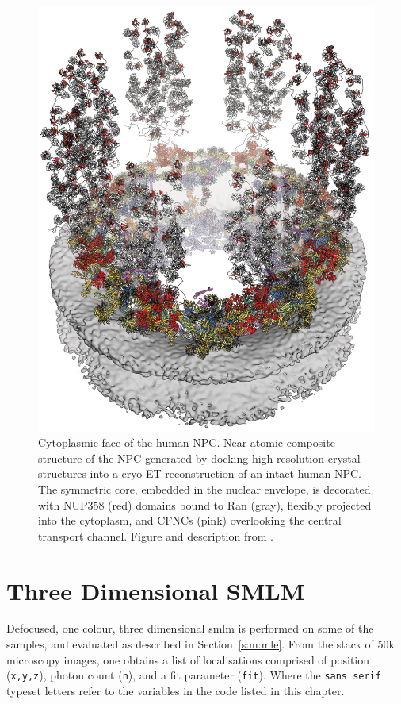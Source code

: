 \documentclass[11pt, a4paper, oneside, twocolumn]{report}
\renewcommand{\tt}{\texttt}
\begin{document}
~ %
\begin{figure}[!p]
  \centering
  \includegraphics[width=\textwidth]{npc/npc3.jpg}
  \caption{Cytoplasmic face of the human NPC.  Near-atomic composite
    structure of the NPC generated by docking high-resolution crystal
    structures into a cryo‑ET reconstruction of an intact human NPC. The
    symmetric core, embedded in the nuclear envelope, is decorated with
    NUP358 (red) domains bound to Ran (gray), flexibly projected into the
    cytoplasm, and CFNCs (pink) overlooking the central transport
    channel. Figure and description from \cite{npc}.}
  \label{f:npc}
\end{figure}

\clearpage\section{Three Dimensional SMLM}\label{s:r:ana}

Defocused, one colour, three dimensional \gls{smlm} is performed on some
of the samples, and evaluated as described in
Section~\ref{s:m:mle}. From the stack of 50k microscopy images, one
obtains a list of localisations comprised of position (\tt{x,y,z}),
photon count (\tt{n}), and a fit parameter (\tt{fit}). Where the
\tt{sans serif} typeset letters refer to the variables in the code
listed in this chapter.
\end{document}
